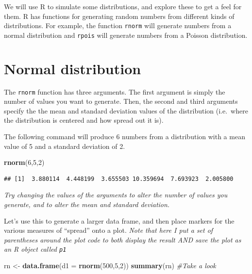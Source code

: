 \documentclass[
  a4paperpaper,
]{book}
\newenvironment{Shaded}{\begin{snugshade}}{\end{snugshade}}
\newcommand{\CommentTok}[1]{\textcolor[rgb]{0.56,0.35,0.01}{\textit{#1}}}
\newcommand{\DataTypeTok}[1]{\textcolor[rgb]{0.13,0.29,0.53}{#1}}
\newcommand{\DecValTok}[1]{\textcolor[rgb]{0.00,0.00,0.81}{#1}}
\newcommand{\KeywordTok}[1]{\textcolor[rgb]{0.13,0.29,0.53}{\textbf{#1}}}
\newcommand{\NormalTok}[1]{#1}
\newcommand{\StringTok}[1]{\textcolor[rgb]{0.31,0.60,0.02}{#1}}
\begin{document}
We will use R to simulate some distributions, and explore these to get a feel for them.
R has functions for generating random numbers from different kinds of distributions. For example, the function \texttt{rnorm} will generate numbers from a normal distribution and \texttt{rpois} will generate numbers from a Poisson distribution.

\hypertarget{normal-distribution}{%
\section{Normal distribution}\label{normal-distribution}}

The \texttt{rnorm} function has three arguments. The first argument is simply the number of values you want to generate. Then, the second and third arguments specify the the mean and standard deviation values of the distribution (i.e.~where the distribution is centered and how spread out it is).

The following command will produce 6 numbers from a distribution with a mean value of 5 and a standard deviation of 2.

\begin{Shaded}
\begin{Highlighting}[]
\KeywordTok{rnorm}\NormalTok{(}\DecValTok{6}\NormalTok{,}\DecValTok{5}\NormalTok{,}\DecValTok{2}\NormalTok{)}
\end{Highlighting}
\end{Shaded}

\begin{verbatim}
## [1]  3.880114  4.448199  3.655503 10.359694  7.693923  2.005800
\end{verbatim}

\emph{Try changing the values of the arguments to alter the number of values you generate, and to alter the mean and standard deviation.}

Let's use this to generate a larger data frame, and then place markers for the various measures of ``spread'' onto a plot. \emph{Note that here I put a set of parentheses around the plot code to both display the result AND save the plot as an R object called \texttt{p1}}

\begin{Shaded}
\begin{Highlighting}[]
\NormalTok{rn \textless{}{-}}\StringTok{ }\KeywordTok{data.frame}\NormalTok{(}\DataTypeTok{d1 =} \KeywordTok{rnorm}\NormalTok{(}\DecValTok{500}\NormalTok{,}\DecValTok{5}\NormalTok{,}\DecValTok{2}\NormalTok{))}
\KeywordTok{summary}\NormalTok{(rn) }\CommentTok{\#Take a look}
\end{Highlighting}
\end{Shaded}
\end{document}
